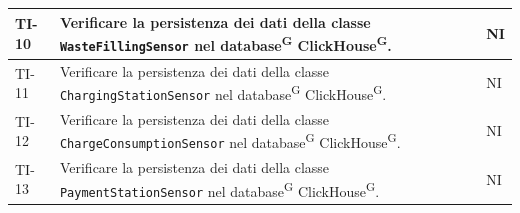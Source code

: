 \documentclass[8pt]{article}
\newcommand{\glossterm}[1]{#1\textsuperscript{G}} %
\begin{document}
\begin{longtable}{|>{\centering}p{2cm}|>{\RaggedRight}m{12cm}|>{\centering\arraybackslash}p{2cm}|}
    TI-10 & Verificare la persistenza dei dati della classe \verb|WasteFillingSensor| nel \glossterm{database} \glossterm{ClickHouse}. & NI \\
    \hline
    
    TI-11 & Verificare la persistenza dei dati della classe \verb|ChargingStationSensor| nel \glossterm{database} \glossterm{ClickHouse}. & NI \\
    \hline

    TI-12 & Verificare la persistenza dei dati della classe \verb|ChargeConsumptionSensor| nel \glossterm{database} \glossterm{ClickHouse}. & NI \\
    \hline

    TI-13 & Verificare la persistenza dei dati della classe \verb|PaymentStationSensor| nel \glossterm{database} \glossterm{ClickHouse}. & NI \\
    \hline
        
\end{longtable}
\clearpage
\end{document}
